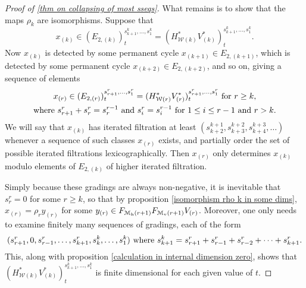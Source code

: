 \documentclass[11pt]{amsart}
\theoremstyle{plain}
\theoremstyle{definition}
\newcommand{\calM}{\mathcal{M}}
\newcommand{\calw}{\mathcal{W}}
\theoremstyle{plain}
\begin{document}
\begin{Calculations of HWn for n nonzero}
\begin{proof}[Proof of \ref{thm on collapsing of most sseqs}]
What remains is to show that the maps $\rho_k$ are isomorphisms. Suppose that 
\[x_{(k)}\in (E_{2,(k)})^{s_{k+1}^{k},\ldots,s_1^{k}}_t=(H^*_{\calw(k)}V^*_{(k)})^{s_{k+1}^{k},\ldots,s_1^{k}}_t.\]
Now $x_{(k)}$ is detected by some permanent cycle $x_{(k+1)}\in E_{2,(k+1)}$, which is detected by some permanent cycle $x_{(k+2)}\in E_{2,(k+2)}$, and so on, giving a sequence of elements
\begin{gather*}
x_{(r)}\in (E_{2,(r)})^{s_{r+1}^{r},\ldots,s_1^{r}}_t=(H^*_{\calw(r)}V^*_{(r)})^{s_{r+1}^{r},\ldots,s_1^{r}}_t\textup{ for $r\geq k$,}\\
\textup{where }s^{r}_{r+1}+s^{r}_{r}=s^{r-1}_{r}\textup{ and }s^{r}_{i}=s^{r-1}_{i}\textup{  for $1\leq i\leq r-1$ and $r>k$}.
\end{gather*}
We will say that $x_{(k)}$ has iterated filtration at least $(s^{k+1}_{k+2},s^{k+2}_{k+3},s^{k+3}_{k+4},\ldots)$ whenever a sequence of such classes $x_{(r)}$ exists, and partially order the set of possible iterated filtrations lexicographically. Then $x_{(r)}$ only determines $x_{(k)}$ modulo elements of $E_{2,(k)}$ of higher iterated filtration.

Simply because these gradings are always non-negative, it is inevitable that $s_r^r=0$ for some $r\geq k$, so that by proposition \ref{isomorphism rho k in some dims}, $x_{(r)}=\rho_ry_{(r)}$ for some $y_{(r)}\in F_{\calM_{\textup{h}}(r+1)}F_{\calM_{\textup{v}}(r+1)}V_{(r)}$. Moreover, one only needs to examine finitely many sequences of gradings, each of the form
\[(s^r_{r+1},0,s^{r}_{r-1},\ldots, s^{r}_{k+1},s^k_{k},\ldots,s^k_1)\textup{ where }s^k_{k+1}=s^r_{r+1}+s^{r}_{r-1}+s^{r}_{r-2}+\cdots +s^{r}_{k+1}.\]
This, along with proposition \ref{calculation in internal dimension zero}, shows that $(H^*_{\calw(k)}V^*_{(k)})^{s_{k+1}^{k},\ldots,s_1^{k}}_t$ is finite dimensional for each given value of $t$.




\end{proof}
\end{Calculations of HWn for n nonzero}
\end{document}
